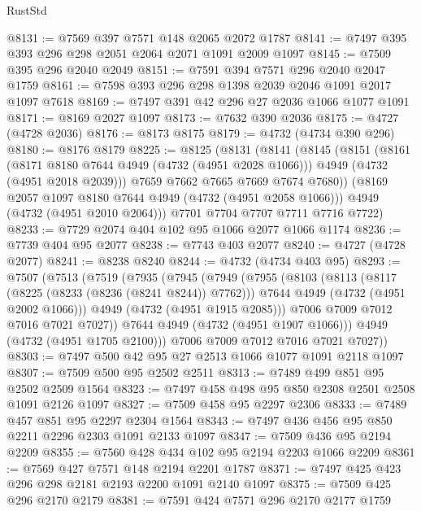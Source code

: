 \begin{lexlean}{RustStd}
\begin{coremodule}
@8131 := @7569 @397 @7571 @148 @2065 @2072 @1787
@8141 := @7497 @395 @393 @296 @298 @2051 @2064 @2071 @1091 @2009 @1097
@8145 := @7509 @395 @296 @2040 @2049
@8151 := @7591 @394 @7571 @296 @2040 @2047 @1759
@8161 := @7598 @393 @296 @298 @1398 @2039 @2046 @1091 @2017 @1097 @7618
@8169 := @7497 @391 @42 @296 @27 @2036 @1066 @1077 @1091
@8171 := @8169 @2027 @1097
@8173 := @7632 @390 @2036
@8175 := @4727 (@4728 @2036)
@8176 := @8173 @8175
@8179 := @4732 (@4734 @390 @296)
@8180 := @8176 @8179
@8225 := @8125
    (@8131
      (@8141
        (@8145
          (@8151
            (@8161
              (@8171 @8180 @7644 @4949 (@4732 (@4951 @2028 @1066)))
              @4949
              (@4732 (@4951 @2018 @2039)))
            @7659
            @7662
            @7665
            @7669
            @7674
            @7680))
        (@8169 @2057 @1097 @8180 @7644 @4949 (@4732 (@4951 @2058 @1066)))
        @4949
        (@4732 (@4951 @2010 @2064)))
      @7701
      @7704
      @7707
      @7711
      @7716
      @7722)
@8233 := @7729 @2074 @404 @102 @95 @1066 @2077 @1066 @1174
@8236 := @7739 @404 @95 @2077
@8238 := @7743 @403 @2077
@8240 := @4727 (@4728 @2077)
@8241 := @8238 @8240
@8244 := @4732 (@4734 @403 @95)
@8293 := @7507
    (@7513
      (@7519
        (@7935
          (@7945
            (@7949
              (@7955
                (@8103
                  (@8113
                    (@8117 (@8225 (@8233 (@8236 (@8241 @8244)) @7762)))
                    @7644
                    @4949
                    (@4732 (@4951 @2002 @1066)))
                  @4949
                  (@4732 (@4951 @1915 @2085)))
                @7006
                @7009
                @7012
                @7016
                @7021
                @7027))
            @7644
            @4949
            (@4732 (@4951 @1907 @1066)))
          @4949
          (@4732 (@4951 @1705 @2100)))
        @7006
        @7009
        @7012
        @7016
        @7021
        @7027))
@8303 := @7497 @500 @42 @95 @27 @2513 @1066 @1077 @1091 @2118 @1097
@8307 := @7509 @500 @95 @2502 @2511
@8313 := @7489 @499 @851 @95 @2502 @2509 @1564
@8323 := @7497 @458 @498 @95 @850 @2308 @2501 @2508 @1091 @2126 @1097
@8327 := @7509 @458 @95 @2297 @2306
@8333 := @7489 @457 @851 @95 @2297 @2304 @1564
@8343 := @7497 @436 @456 @95 @850 @2211 @2296 @2303 @1091 @2133 @1097
@8347 := @7509 @436 @95 @2194 @2209
@8355 := @7560 @428 @434 @102 @95 @2194 @2203 @1066 @2209
@8361 := @7569 @427 @7571 @148 @2194 @2201 @1787
@8371 := @7497 @425 @423 @296 @298 @2181 @2193 @2200 @1091 @2140 @1097
@8375 := @7509 @425 @296 @2170 @2179
@8381 := @7591 @424 @7571 @296 @2170 @2177 @1759

\end{coremodule}
\end{lexlean}
